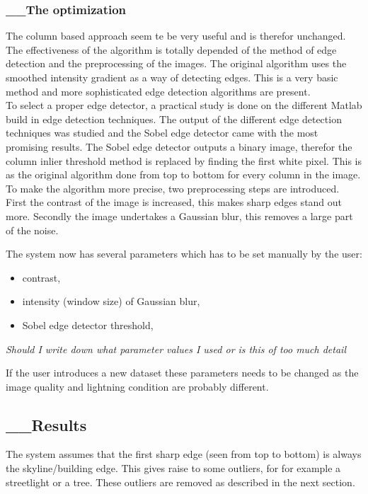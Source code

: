 \documentclass[10pt]{article}
\begin{document}
  \subsubsection{__The optimization}
The column based approach seem te be very useful and is therefor unchanged. 
The effectiveness of the algorithm is totally depended of the method of edge
detection and the preprocessing of the images. 
The original algorithm uses the smoothed intensity gradient as a way of
detecting edges. This is a very basic method and more sophisticated edge
detection algorithms are present.\\
To select a proper edge detector, a practical study is done on the different
Matlab build in edge detection techniques. The output of the different edge
detection techniques was studied and the Sobel edge detector came with the most
promising results. The Sobel edge detector outputs a binary image, therefor the column inlier
threshold method is replaced by finding the first white pixel. This is as the
original algorithm done from top to bottom for every column in the image.
\\ 
To make the algorithm more precise, two preprocessing
steps are introduced. First the contrast of the image is increased, this makes
sharp edges stand out more.  Secondly the image undertakes a Gaussian blur,
this removes a large part of the noise.

The system now has several parameters which has to be set manually by the user:
\begin{itemize}
	\item contrast,
	\item intensity (window size) of Gaussian blur,
	\item Sobel edge detector threshold,
\end{itemize}
\textit{Should I write down what parameter values I used or is this of too much
detail}

If the user introduces a new dataset these parameters needs to be changed
as the image quality and lightning condition are probably different.

 \subsection{__Results}%
The system assumes that the first sharp edge (seen from top to bottom) is
always the skyline/building edge. This gives raise to some outliers, for 
for example a streetlight or a tree. These outliers are removed as described in
the next section.  
\end{document}
